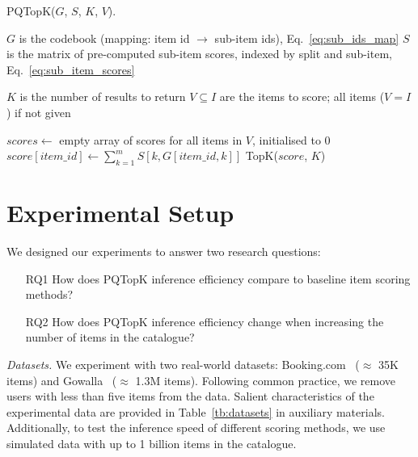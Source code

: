 \documentclass[sigconf,natbib=true, review=true]{acmart} %
\newcommand{\pageenlarge}[1]{\marginnote{#1}\enlargethispage{#1\baselineskip}}
\begin{document}
\begin{algorithm}[tb]
\small
\caption{PQTopK($G$, $S$, $K$, $V$).}\label{alg:top_k}
\begin{algorithmic}[1]
   \Require $G$ is the codebook (mapping: item id $\rightarrow$ sub-item ids), Eq.~\eqref{eq:sub_ids_map}
   \Require $S$ is the matrix of pre-computed sub-item scores, indexed by split and sub-item, Eq.~\eqref{eq:sub_item_scores}

   \Require $K$ is the number of results to return
   \Require $V \subseteq I$ are the items to score; all items ($V = I$)  if not given 
   
   \State $scores \gets$ empty array of scores for all items in $V$, initialised to 0
    \label{alg:outer_loop} 
        \State $score[item\_id] \gets \sum_{k=1}^{m} S[k,G[item\_id,k]] \label{alg:inner_loop} $ 
   \EndFor
   \State \Return TopK($score$, $K$)  
\end{algorithmic}
\end{algorithm}

\pageenlarge{3}
\section{Experimental Setup}\label{sec:experiments}
We designed our experiments to answer two research questions: 
\begin{itemize}
    \item[RQ1] How does PQTopK inference efficiency compare to baseline item scoring methods? 
    \item[RQ2] How does PQTopK inference efficiency change when increasing the number of items in the catalogue? 
\end{itemize}

\textit{Datasets.} We experiment with two real-world datasets: Booking.com~\cite{goldenberg_bookingcom_2021}  ($\approx$ 35K items) and Gowalla~\cite{choFriendshipMobilityUser2011} ($\approx$ 1.3M items). Following common practice, we remove users with less than five items from the data. Salient characteristics of the experimental data are provided in Table~\ref{tb:datasets} in auxiliary materials. Additionally, to test the inference speed of different scoring methods, we use simulated data with up to 1 billion items in the catalogue. 
\end{document}

